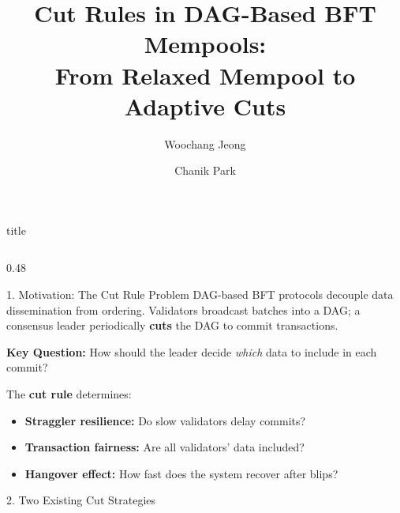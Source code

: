 \documentclass[final]{beamer}
\title{\Huge Cut Rules in DAG-Based BFT Mempools:\\From Relaxed Mempool to Adaptive Cuts}
\author{\Large Woochang Jeong \and Chanik Park}
\institute{\large Computer Science and Engineering, POSTECH, South Korea}
\date{}
\begin{document}
\begin{frame}[t]

\vspace{-1cm}
\begin{beamercolorbox}[wd=\paperwidth,colsep*=1.5cm]{title}
\inserttitle\par
\vspace{0.5cm}
\insertauthor\par
\vspace{0.3cm}
\insertinstitute
\vspace{0.5cm}
\end{beamercolorbox}

\vspace{1cm}

\begin{columns}[T]

\begin{column}{0.48\textwidth}

\begin{block}{1. Motivation: The Cut Rule Problem}
\large
DAG-based BFT protocols decouple data dissemination from ordering. Validators broadcast batches into a DAG; a consensus leader periodically \textbf{cuts} the DAG to commit transactions.

\vspace{0.5cm}
\textbf{Key Question:} How should the leader decide \emph{which} data to include in each commit?

\vspace{0.5cm}
The \textbf{cut rule} determines:
\begin{itemize}[leftmargin=2cm]
    \item[\textbullet] \textbf{Straggler resilience:} Do slow validators delay commits?
    \item[\textbullet] \textbf{Transaction fairness:} Are all validators' data included?
    \item[\textbullet] \textbf{Hangover effect:} How fast does the system recover after blips?
\end{itemize}
\end{block}

\vspace{1cm}

\begin{block}{2. Two Existing Cut Strategies}
\large

\vspace{0.5cm}
\begin{center}
\end{center}
\end{block}
\end{column}
\end{columns}
\end{frame}
\end{document}
